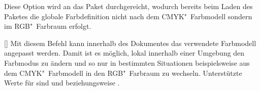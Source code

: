 \begin{Bundle*}{}
\begin{Declaration}{}
\printdeclarationlist%
%
Diese Option wird an das Paket  durchgereicht, wodurch bereits 
beim Laden des Paketes die globale Farbdefinition nicht nach dem 
CMYK"~Farbmodell sondern im RGB"~Farbraum erfolgt.
\end{Declaration}

\begin{Declaration}{[]}
\printdeclarationlist%
%
Mit diesem Befehl kann innerhalb des Dokumentes das verwendete Farbmodell 
angepasst werden. Damit ist es möglich, lokal innerhalb einer Umgebung den 
Farbmodus zu ändern und so nur in bestimmten Situationen beispielsweise aus dem 
CMYK"~Farbmodell in den RGB"~Farbraum zu wechseln. Unterstützte Werte für 
 sind  und  beziehungsweise 
.
\end{Declaration}

\smallskip\noindent
{}%
%
%
\end{Bundle*}



